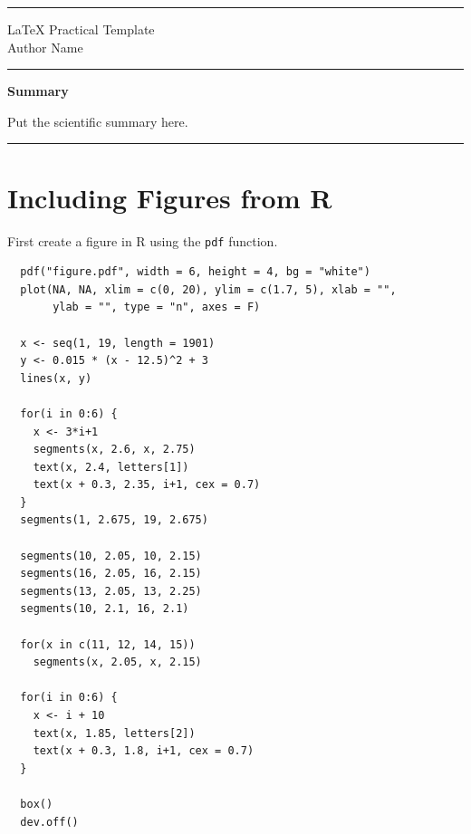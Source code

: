 \documentclass[12pt]{article}
\begin{document}
\thispagestyle{empty}
\hrule
\vspace{1em}
\begin{center}
{\Huge \LaTeX{} Practical Template} \\
\vspace{2em}
Author Name
\end{center}
\vspace{2em}
\hrule

\vspace{4em}

\begin{center}
{\Large \bf Summary}
\end{center}

Put the scientific summary here.

\vspace{4em}

\tableofcontents

\vfill

\hrule

\newpage
\setcounter{page}{1}
\section{Including Figures from R}

First create a figure in R using the \texttt{pdf} function.

\begin{verbatim}
  pdf("figure.pdf", width = 6, height = 4, bg = "white")
  plot(NA, NA, xlim = c(0, 20), ylim = c(1.7, 5), xlab = "",
       ylab = "", type = "n", axes = F)

  x <- seq(1, 19, length = 1901)
  y <- 0.015 * (x - 12.5)^2 + 3
  lines(x, y)

  for(i in 0:6) {
    x <- 3*i+1
    segments(x, 2.6, x, 2.75)
    text(x, 2.4, letters[1])
    text(x + 0.3, 2.35, i+1, cex = 0.7)
  }
  segments(1, 2.675, 19, 2.675)

  segments(10, 2.05, 10, 2.15)
  segments(16, 2.05, 16, 2.15)
  segments(13, 2.05, 13, 2.25)
  segments(10, 2.1, 16, 2.1)

  for(x in c(11, 12, 14, 15))
    segments(x, 2.05, x, 2.15)

  for(i in 0:6) {
    x <- i + 10
    text(x, 1.85, letters[2])
    text(x + 0.3, 1.8, i+1, cex = 0.7)
  }

  box()
  dev.off()
\end{verbatim}
\end{document}
